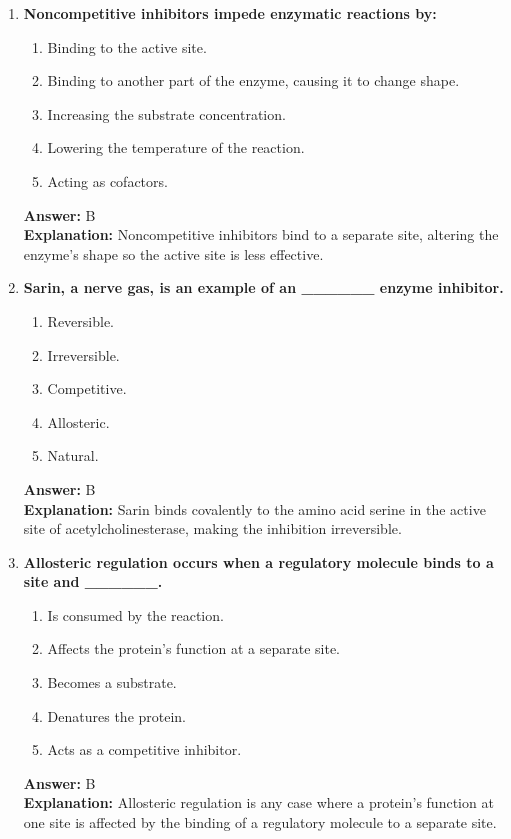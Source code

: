 \documentclass[11pt, a4paper]{article}
\begin{document}
\begin{enumerate}[leftmargin=*, label=\arabic*.]
\item \textbf{Noncompetitive inhibitors impede enzymatic reactions by:}
\begin{enumerate}[label=\Alph*.]
    \item Binding to the active site.
    \item Binding to another part of the enzyme, causing it to change shape.
    \item Increasing the substrate concentration.
    \item Lowering the temperature of the reaction.
    \item Acting as cofactors.
\end{enumerate}
\textbf{Answer:} B \\
\textbf{Explanation:} Noncompetitive inhibitors bind to a separate site, altering the enzyme's shape so the active site is less effective.

\item \textbf{Sarin, a nerve gas, is an example of an \_\_\_\_\_\_ enzyme inhibitor.}
\begin{enumerate}[label=\Alph*.]
    \item Reversible.
    \item Irreversible.
    \item Competitive.
    \item Allosteric.
    \item Natural.
\end{enumerate}
\textbf{Answer:} B \\
\textbf{Explanation:} Sarin binds covalently to the amino acid serine in the active site of acetylcholinesterase, making the inhibition irreversible.

\item \textbf{Allosteric regulation occurs when a regulatory molecule binds to a site and \_\_\_\_\_\_.}
\begin{enumerate}[label=\Alph*.]
    \item Is consumed by the reaction.
    \item Affects the protein's function at a separate site.
    \item Becomes a substrate.
    \item Denatures the protein.
    \item Acts as a competitive inhibitor.
\end{enumerate}
\textbf{Answer:} B \\
\textbf{Explanation:} Allosteric regulation is any case where a protein's function at one site is affected by the binding of a regulatory molecule to a separate site.


\end{enumerate}
\end{document}
